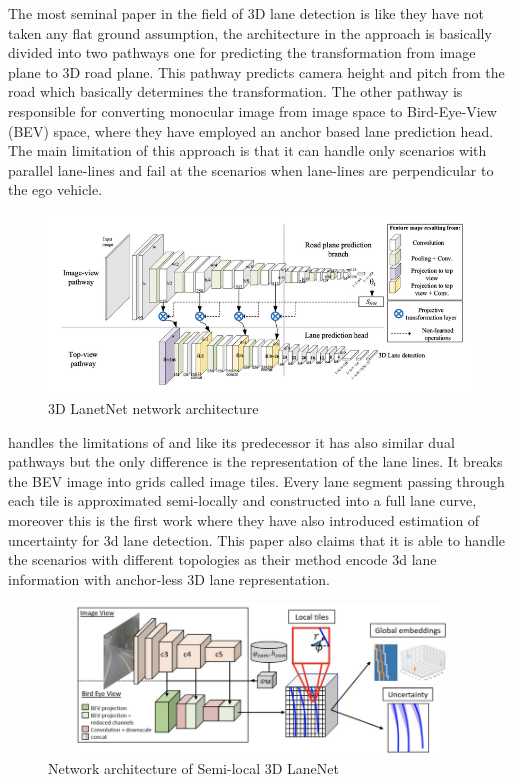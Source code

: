 The most seminal paper in the field of 3D lane detection is \cite{DBLP:journals/corr/abs-1811-10203} like \cite{DBLP:journals/corr/abs-1802-05591} they have not taken any flat ground assumption, the architecture in the approach is basically divided into two pathways one for predicting the transformation from image plane to 3D road plane. This pathway predicts camera height and pitch from the road which basically determines the transformation. The other pathway is responsible for converting monocular image from image space to Bird-Eye-View (BEV) space, where they have employed an anchor based lane prediction head. The main limitation of this approach is that it can handle only scenarios with parallel lane-lines and fail at the scenarios when lane-lines are perpendicular to the ego vehicle. 

\begin{figure}[h]
    \centering
    \includegraphics[width=\textwidth]{images/3dlanenet.png}
    \caption{\cite{DBLP:journals/corr/abs-1811-10203} 3D LanetNet network architecture}
    \end{figure}

\cite{DBLP:journals/corr/abs-2011-01535} handles the limitations of \cite{DBLP:journals/corr/abs-1811-10203} and like its predecessor it has also similar dual pathways but the only difference is the representation of the lane lines. It breaks the BEV image into grids called image tiles.
Every lane segment passing through each tile is approximated semi-locally and constructed into a full lane curve, moreover this is the first work where they have also introduced estimation of uncertainty for 3d lane detection. This paper also claims that it is able to handle the scenarios with different topologies as their method encode 3d lane information with anchor-less 3D lane representation. 

 \begin{figure}[h]
    \centering
    \includegraphics[width=12cm, height=4cm]{images/3DLaneNET++.png}
    \caption{Network architecture of Semi-local 3D LaneNet \cite{DBLP:journals/corr/abs-2011-01535}}
    \end{figure}

